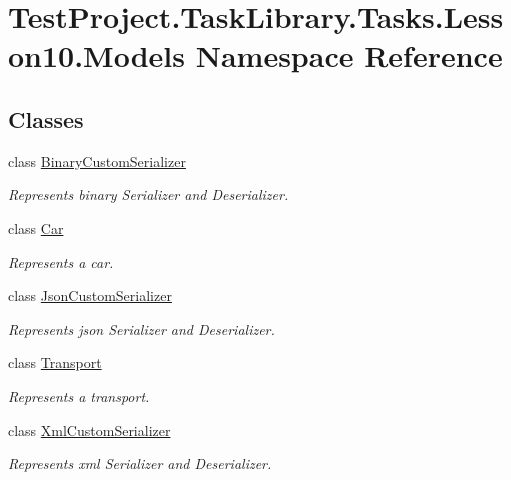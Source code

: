 \hypertarget{namespace_test_project_1_1_task_library_1_1_tasks_1_1_lesson10_1_1_models}{}\section{Test\+Project.\+Task\+Library.\+Tasks.\+Lesson10.\+Models Namespace Reference}
\label{namespace_test_project_1_1_task_library_1_1_tasks_1_1_lesson10_1_1_models}
\subsection*{Classes}
\begin{DoxyCompactItemize}
\item 
class \mbox{\hyperlink{class_test_project_1_1_task_library_1_1_tasks_1_1_lesson10_1_1_models_1_1_binary_custom_serializer}{Binary\+Custom\+Serializer}}
\begin{DoxyCompactList}\small\item\em Represents binary Serializer and Deserializer. \end{DoxyCompactList}\item 
class \mbox{\hyperlink{class_test_project_1_1_task_library_1_1_tasks_1_1_lesson10_1_1_models_1_1_car}{Car}}
\begin{DoxyCompactList}\small\item\em Represents a car. \end{DoxyCompactList}\item 
class \mbox{\hyperlink{class_test_project_1_1_task_library_1_1_tasks_1_1_lesson10_1_1_models_1_1_json_custom_serializer}{Json\+Custom\+Serializer}}
\begin{DoxyCompactList}\small\item\em Represents json Serializer and Deserializer. \end{DoxyCompactList}\item 
class \mbox{\hyperlink{class_test_project_1_1_task_library_1_1_tasks_1_1_lesson10_1_1_models_1_1_transport}{Transport}}
\begin{DoxyCompactList}\small\item\em Represents a transport. \end{DoxyCompactList}\item 
class \mbox{\hyperlink{class_test_project_1_1_task_library_1_1_tasks_1_1_lesson10_1_1_models_1_1_xml_custom_serializer}{Xml\+Custom\+Serializer}}
\begin{DoxyCompactList}\small\item\em Represents xml Serializer and Deserializer. \end{DoxyCompactList}\end{DoxyCompactItemize}
